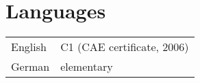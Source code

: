 \documentclass[a4paper, oneside, final]{scrartcl} %
\newcommand{\gray}{\rowcolor[gray]{.90}} %
\begin{document}


\section{Languages}
\begin{tabularx}{0.97\linewidth}{>{\raggedleft}p{2cm}X}
  English & C1 (CAE certificate, 2006) \\
  German & elementary \\ 
\end{tabularx}
\end{document}
